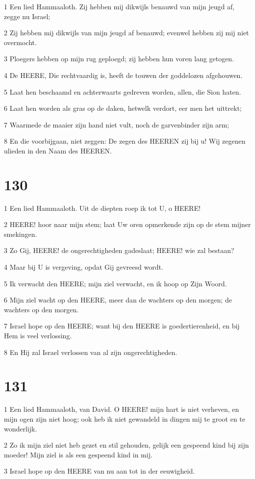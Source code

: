 \par 1 Een lied Hammaaloth. Zij hebben mij dikwijls benauwd van mijn jeugd af, zegge nu Israel;
\par 2 Zij hebben mij dikwijls van mijn jeugd af benauwd; evenwel hebben zij mij niet overmocht.
\par 3 Ploegers hebben op mijn rug geploegd; zij hebben hun voren lang getogen.
\par 4 De HEERE, Die rechtvaardig is, heeft de touwen der goddelozen afgehouwen.
\par 5 Laat hen beschaamd en achterwaarts gedreven worden, allen, die Sion haten.
\par 6 Laat hen worden als gras op de daken, hetwelk verdort, eer men het uittrekt;
\par 7 Waarmede de maaier zijn hand niet vult, noch de garvenbinder zijn arm;
\par 8 En die voorbijgaan, niet zeggen: De zegen des HEEREN zij bij u! Wij zegenen ulieden in den Naam des HEEREN.

\chapter{130}

\par 1 Een lied Hammaaloth. Uit de diepten roep ik tot U, o HEERE!
\par 2 HEERE! hoor naar mijn stem; laat Uw oren opmerkende zijn op de stem mijner smekingen.
\par 3 Zo Gij, HEERE! de ongerechtigheden gadeslaat; HEERE! wie zal bestaan?
\par 4 Maar bij U is vergeving, opdat Gij gevreesd wordt.
\par 5 Ik verwacht den HEERE; mijn ziel verwacht, en ik hoop op Zijn Woord.
\par 6 Mijn ziel wacht op den HEERE, meer dan de wachters op den morgen; de wachters op den morgen.
\par 7 Israel hope op den HEERE; want bij den HEERE is goedertierenheid, en bij Hem is veel verlossing.
\par 8 En Hij zal Israel verlossen van al zijn ongerechtigheden.

\chapter{131}

\par 1 Een lied Hammaaloth, van David. O HEERE! mijn hart is niet verheven, en mijn ogen zijn niet hoog; ook heb ik niet gewandeld in dingen mij te groot en te wonderlijk.
\par 2 Zo ik mijn ziel niet heb gezet en stil gehouden, gelijk een gespeend kind bij zijn moeder! Mijn ziel is als een gespeend kind in mij.
\par 3 Israel hope op den HEERE van nu aan tot in der eeuwigheid.

